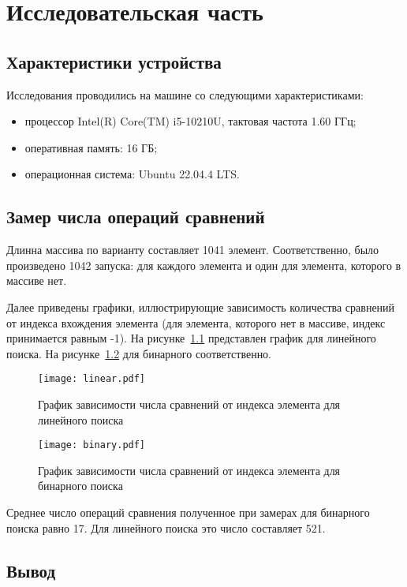 \chapter{Исследовательская часть}
\section{Характеристики устройства}

Исследования проводились на машине со следующими характеристиками:
\begin{itemize}[label=---]
	\item процессор Intel(R) Core(TM) i5-10210U, тактовая частота 1.60 ГГц;
	\item оперативная память: 16 ГБ;
	\item операционная система: Ubuntu 22.04.4 LTS.
\end{itemize}

\section{Замер числа операций сравнений}

Длинна массива по варианту составляет 1041 элемент. Соответственно, было произведено 1042 запуска: для каждого элемента и один для элемента, которого в массиве нет.

Далее приведены графики, иллюстрирующие зависимость количества сравнений от индекса вхождения элемента (для элемента, которого нет в массиве, индекс принимается равным -1). На рисунке~\ref{fig:lin_plot} представлен график для линейного поиска. На рисунке~\ref{fig:bin_plot} для бинарного соответственно.
\begin{figure}[H]
	\centering
	\texttt{[image: linear.pdf]}
	\caption{График зависимости числа сравнений от индекса элемента для линейного поиска}
	\label{fig:lin_plot}
\end{figure}
\begin{figure}[H]
	\centering
	\texttt{[image: binary.pdf]}
	\caption{График зависимости числа сравнений от индекса элемента для бинарного поиска}
	\label{fig:bin_plot}
\end{figure}

Среднее число операций сравнения полученное при замерах для бинарного поиска равно 17. Для линейного поиска это число составляет 521.

\section{Вывод}

